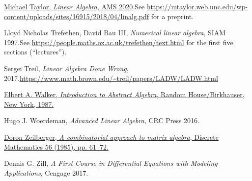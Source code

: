 \documentclass[numbers=enddot,12pt,final,onecolumn,notitlepage]{scrartcl}%
\numberwithin{exer}{subsection}
\theoremstyle{definition}
\begin{document}
\begin{thebibliography}{99999999}
%
\href{https://bookstore.ams.org/amstext-45/}{Michael Taylor, \textit{Linear
Algebra}, AMS 2020}.\newline See
\url{https://mtaylor.web.unc.edu/wp-content/uploads/sites/16915/2018/04/linalg.pdf}
for a preprint.

Lloyd Nicholas Trefethen, David Bau III,
\textit{Numerical linear algebra}, SIAM 1997.\newline See
\url{https://people.maths.ox.ac.uk/trefethen/text.html} for the first five
sections (\textquotedblleft lectures\textquotedblright).

Sergei Treil, \textit{Linear Algebra Done Wrong},
2017.\newline\url{https://www.math.brown.edu/~treil/papers/LADW/LADW.html}

%
\href{https://web.archive.org/web/20170809055317/https://www.math.nmsu.edu/~elbert/AbsAlgeb.pdf}{Elbert
A. Walker, \textit{Introduction to Abstract Algebra}, Random House/Birkhauser,
New York, 1987.}

Hugo J. Woerdeman, \textit{Advanced Linear
Algebra}, CRC Press 2016.

%
\href{http://www.math.rutgers.edu/~zeilberg/mamarimY/DM85.pdf}{Doron
Zeilberger, \textit{A combinatorial approach to matrix algebra}, Discrete
Mathematics 56 (1985), pp. 61--72.}

Dennis G. Zill, \textit{A First Course in Differential
Equations with Modeling Applications}, Cengage 2017.
\end{thebibliography}
\end{document}
